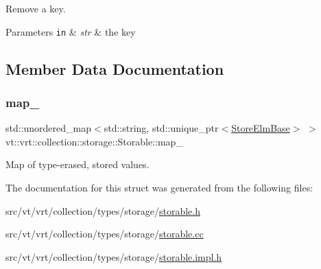 Remove a key. 


\begin{DoxyParams}[1]{Parameters}
\mbox{\tt in}  & {\em str} & the key \\
\hline
\end{DoxyParams}


\subsection{Member Data Documentation}
\mbox{\label{structvt_1_1vrt_1_1collection_1_1storage_1_1_storable_ade35c0e0ef45b53ffad56cbc349cfb82}} 
\subsubsection{\texorpdfstring{map\+\_\+}{map\_}}
{\footnotesize\ttfamily std\+::unordered\+\_\+map$<$std\+::string, std\+::unique\+\_\+ptr$<$\hyperlink{structvt_1_1vrt_1_1collection_1_1storage_1_1_store_elm_base}{Store\+Elm\+Base}$>$ $>$ vt\+::vrt\+::collection\+::storage\+::\+Storable\+::map\+\_\+\hspace{0.3cm}{\ttfamily [private]}}



Map of type-\/erased, stored values. 



The documentation for this struct was generated from the following files\+:\begin{DoxyCompactItemize}
\item 
src/vt/vrt/collection/types/storage/\hyperlink{storable_8h}{storable.\+h}\item 
src/vt/vrt/collection/types/storage/\hyperlink{storable_8cc}{storable.\+cc}\item 
src/vt/vrt/collection/types/storage/\hyperlink{storable_8impl_8h}{storable.\+impl.\+h}\end{DoxyCompactItemize}
